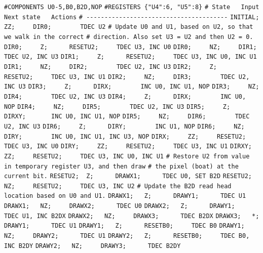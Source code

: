 \begin{apgsembly}
	\centering
	\begin{minipage}[t]{.49\textwidth}
		\begin{algorithmic}\tiny
			\State \verb|#COMPONENTS U0-5,B0,B2D,NOP|
			\State \verb|#REGISTERS {"U4":6, "U5":8}|
			\State \verb|# State   Input   Next state   Actions|
			\State \verb|# ---------------------------------------|
			\State \verb|INITIAL;  ZZ;     DIR0;        TDEC U2|
			\State
			\State \verb|# Update U0 and U1, based on U2, so that we walk in the correct|
			\State \verb|# direction. Also set U3 = U2 and then U2 = 0.|
			\State \verb|DIR0;     Z;      RESETU2;     TDEC U3, INC U0|
			\State \verb|DIR0;     NZ;     DIR1;        TDEC U2, INC U3|
			\State \verb|DIR1;     Z;      RESETU2;     TDEC U3, INC U0, INC U1|
			\State \verb|DIR1;     NZ;     DIR2;        TDEC U2, INC U3|
			\State \verb|DIR2;     Z;      RESETU2;     TDEC U3, INC U1|
			\State \verb|DIR2;     NZ;     DIR3;        TDEC U2, INC U3|
			\State \verb|DIR3;     Z;      DIRX;        INC U0, INC U1, NOP|
			\State \verb|DIR3;     NZ;     DIR4;        TDEC U2, INC U3|
			\State \verb|DIR4;     Z;      DIRX;        INC U0, NOP|
			\State \verb|DIR4;     NZ;     DIR5;        TDEC U2, INC U3|
			\State \verb|DIR5;     Z;      DIRXY;       INC U0, INC U1, NOP|
			\State \verb|DIR5;     NZ;     DIR6;        TDEC U2, INC U3|
			\State \verb|DIR6;     Z;      DIRY;        INC U1, NOP|
			\State \verb|DIR6;     NZ;     DIRY;        INC U0, INC U1, INC U3, NOP|
			\State \verb|DIRX;     ZZ;     RESETU2;     TDEC U3, INC U0|
			\State \verb|DIRY;     ZZ;     RESETU2;     TDEC U3, INC U1|
			\State \verb|DIRXY;    ZZ;     RESETU2;     TDEC U3, INC U0, INC U1|
			\State
			\State \verb|# Restore U2 from value in temporary register U3, and then draw|
			\State \verb|# the pixel (boat) at the current bit.|
			\State \verb|RESETU2;  Z;      DRAWX1;      TDEC U0, SET B2D|
			\State \verb|RESETU2;  NZ;     RESETU2;     TDEC U3, INC U2|
			\State
			\State \verb|# Update the B2D read head location based on U0 and U1.|
			\State \verb|DRAWX1;   Z;      DRAWY1;      TDEC U1|
			\State \verb|DRAWX1;   NZ;     DRAWX2;      TDEC U0|
			\State \verb|DRAWX2;   Z;      DRAWY1;      TDEC U1, INC B2DX|
			\State \verb|DRAWX2;   NZ;     DRAWX3;      TDEC B2DX|
			\State \verb|DRAWX3;   *;      DRAWY1;      TDEC U1|
			\State \verb|DRAWY1;   Z;      RESETB0;     TDEC B0|
			\State \verb|DRAWY1;   NZ;     DRAWY2;      TDEC U1|
			\State \verb|DRAWY2;   Z;      RESETB0;     TDEC B0, INC B2DY|
			\State \verb|DRAWY2;   NZ;     DRAWY3;      TDEC B2DY|

\end{algorithmic}
\end{minipage}
\end{apgsembly}
